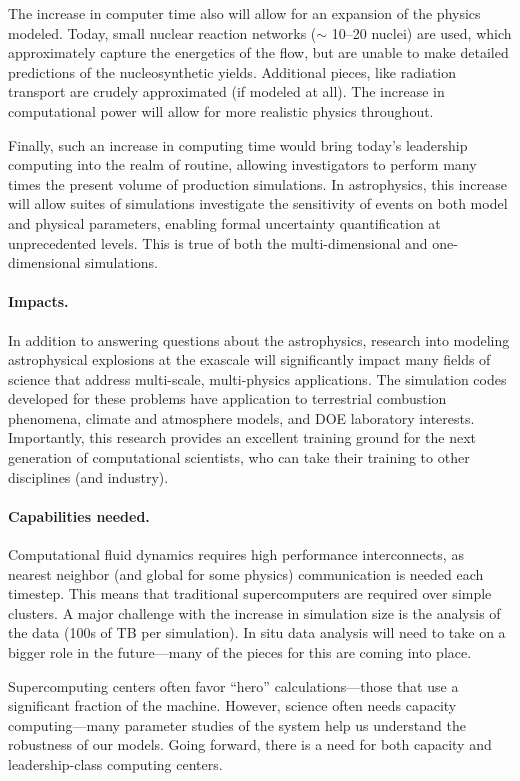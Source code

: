 \documentclass[11pt,twocolumn]{article}
\begin{document}
The increase in computer time also will allow for an expansion of the
physics modeled.  Today, small nuclear reaction networks ($\sim$
10--20 nuclei) are used, which approximately capture the energetics of
the flow, but are unable to make detailed predictions of the
nucleosynthetic yields.  Additional pieces, like radiation transport
are crudely approximated (if modeled at all).  The increase in
computational power will allow for more realistic physics throughout.

Finally, such an increase in computing time would bring today's
leadership computing into the realm of routine, allowing investigators
to perform many times the present volume of production simulations.
In astrophysics, this increase will allow suites of simulations 
investigate the sensitivity of events on both model and physical
parameters, enabling formal uncertainty quantification at 
unprecedented levels.  This is true of both the multi-dimensional
and one-dimensional simulations.

\paragraph*{Impacts.} In addition to answering questions about the 
astrophysics, research into modeling astrophysical explosions at the
exascale will significantly impact many fields of science that address
multi-scale, multi-physics applications.  The simulation codes
developed for these problems have application to terrestrial combustion
phenomena, climate and atmosphere models, and DOE laboratory interests.
Importantly, this research provides an excellent training ground for
the next generation of computational scientists, who can take their
training to other disciplines (and industry).


\paragraph*{Capabilities needed.}  Computational fluid dynamics requires 
high performance interconnects, as nearest neighbor (and global for
some physics) communication is needed each timestep.  This means that
traditional supercomputers are required over simple clusters.  A major
challenge with the increase in simulation size is the analysis of the
data (100s of TB per simulation).  In situ data analysis will need to
take on a bigger role in the future---many of the pieces for this are
coming into place.

Supercomputing centers often favor ``hero'' calculations---those that
use a significant fraction of the machine.
However, science often needs capacity computing---many parameter
studies of the system help us understand the robustness of our models.
Going forward, there is a need for both capacity and leadership-class
computing centers.
\end{document}
